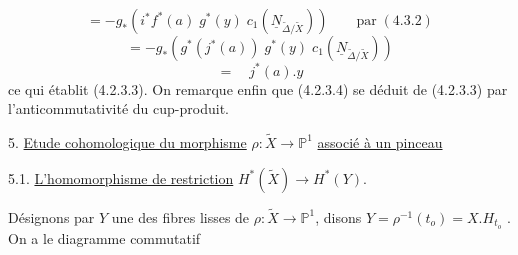 \begin{equation*}
 = - g_*(i^*f^*(a) \; g^*(y) \; c_1(\underline{N}_{\widetilde{\Delta}/\widetilde{X}})) \qquad \mathrm{par} \; (4.3.2)
\end{equation*}
\begin{equation*}
= - g_*(g^*(j^*(a)) \; g^*(y) \; c_1(\underline{N}_{\widetilde{\Delta}/\widetilde{X}}))
\end{equation*}
\begin{equation*}
= \quad j^*(a).y
\end{equation*}
ce qui établit (4.2.3.3). On remarque enfin que (4.2.3.4) se déduit de (4.2.3.3) par l'anticommutativité du cup-produit.


5. \underline{Etude cohomologique du morphisme} $\rho : \widetilde{X} \longrightarrow \mathbb{P}^1$ \underline{associé à un pinceau}


5.1. \underline{L'homomorphisme de restriction} $H^*(\widetilde{X}) \longrightarrow H^*(Y)$.

Désignons par $Y$ une des fibres lisses de $\rho : \widetilde{X} \longrightarrow \mathbb{P}^1$, disons $Y = \rho^{-1}(t_o) = X.H_{t_o}$ . On a le diagramme commutatif

